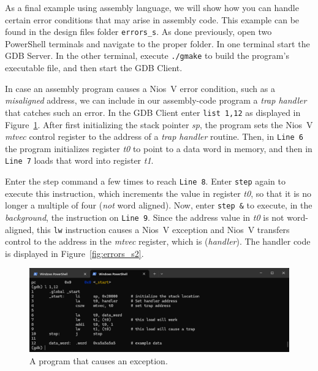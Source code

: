 \documentclass[11pt, twoside, pdftex]{article}
\begin{document}
As a final example using assembly language, we will show how you can handle certain error
conditions that may arise in assembly code.  This example can be found in the design files folder
\texttt{errors\_s}.  As done previously, open two PowerShell terminals and navigate to
the proper folder. In one terminal start the GDB Server. In the other terminal, 
execute \texttt{./gmake} to build the program's executable file, and then start the GDB Client.

In case an assembly program causes a Nios~V error condition, such as a {\it misaligned} address,
we can include in our assembly-code program a {\it trap handler} that catches such an error. 
In the GDB Client enter \texttt{list 1,12} as displayed in Figure~\ref{fig:errors_s1}.
After first initializing the stack pointer {\it sp}, the program sets the Nios~V {\it mtvec}
control register to the address of a {\it trap handler} routine. Then, in \texttt{Line 6} the
program initializes register {\it t0} to point to a data word in memory, and then in
\texttt{Line 7} loads that word into register {\it t1}. 

Enter the step command a few times to reach \texttt{Line 8}. Enter \texttt{step} again to 
execute this instruction, which increments the value in register {\it t0}, so that it is no 
longer a multiple of four ({\it not} word aligned). Now, enter \texttt{step \&} to
execute, in the {\it background}, the 
instruction on \texttt{Line 9}. Since the address value in {\it t0} is not word-aligned, 
this \texttt{lw} instruction causes a Nios~V exception and Nios~V transfers control to the 
address in the {\it mtvec} register, which is ({\it handler}). The handler code is
displayed in Figure~\ref{fig:errors_s2}. 

\begin{figure}[h]
    \begin{center}
        \includegraphics[scale=.6]{figures/errors_s1.png}
        \caption{A program that causes an exception.}
        \label{fig:errors_s1}
    \end{center}
\end{figure}
\end{document}

